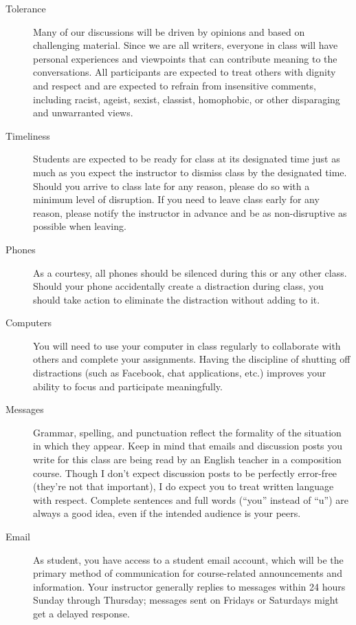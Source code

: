 \documentclass[11pt,oneside]{amsart}	%
\begin{document}
	\begin{description}
	\item[Tolerance] Many of our discussions will be driven by opinions and based on challenging material.  Since we are all writers, everyone in class will have personal experiences and viewpoints that can contribute meaning to the conversations.  All participants are expected to treat others with dignity and respect and are expected to refrain from insensitive comments, including racist, ageist, sexist, classist, homophobic, or other disparaging and unwarranted views.
	\item[Timeliness] Students are expected to be ready for class at its designated time just as much as you expect the instructor to dismiss class by the designated time.  Should you arrive to class late for any reason, please do so with a minimum level of disruption.  If you need to leave class early for any reason, please notify the instructor in advance and be as non-disruptive as possible when leaving.
	\item[Phones] As a courtesy, all phones should be silenced during this or any other class. Should your phone accidentally create a distraction during class, you should take action to eliminate the distraction without adding to it.
	\item[Computers] You will need to use your computer in class regularly to collaborate with others and complete your assignments. Having the discipline of shutting off distractions (such as Facebook, chat applications, etc.) improves your ability to focus and participate meaningfully.
	\item[Messages] Grammar, spelling, and punctuation reflect the formality of the situation in which they appear.  Keep in mind that emails and discussion posts you write for this class are being read by an English teacher in a composition course.  Though I don't expect discussion posts to be perfectly error-free (they're not that important), I do expect you to treat written language with respect. Complete sentences and full words (``you'' instead of ``u'') are always a good idea, even if the intended audience is your peers.
	\item[Email] As  student, you have access to a student email account, which will be the primary method of communication for course-related announcements and information. Your instructor generally replies to messages within 24 hours Sunday through Thursday; messages sent on Fridays or Saturdays might get a delayed response.
	\end{description}
	
\end{document}
